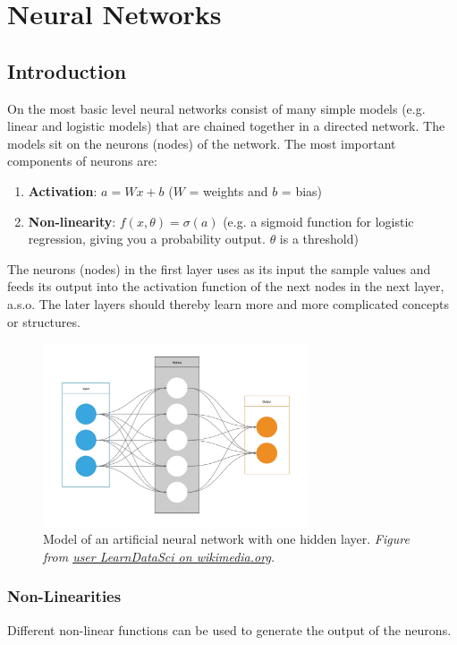 \documentclass[../main.tex]{subfiles}
\begin{document}
\section{Neural Networks} \label{Neural Networks}

\subsection{Introduction}
On the most basic level neural networks consist of many simple models (e.g. linear and logistic models) that are chained together in a directed network. The models sit on the neurons (nodes) of the network. The most important components of neurons are:
\begin{enumerate}
    \item \textbf{Activation}: $a = Wx+b$ ($W$ = weights and $b$ = bias)
    \item \textbf{Non-linearity}: $f(x, \theta)=\sigma(a)$ (e.g. a sigmoid function for logistic regression, giving you a probability output. $\theta$ is a threshold)    
\end{enumerate}
The neurons (nodes) in the first layer uses as its input the sample values and feeds its output into the activation function of the next nodes in the next layer, a.s.o. The later layers should thereby learn more and more complicated concepts or structures. 

\begin{figure}[h]
    \centering
    \includegraphics[width=0.7\textwidth]{../figures/Artificial_Neural_Network.jpg}
    \caption{Model of an artificial neural network with one hidden layer. \textit{Figure from \href{https://commons.wikimedia.org/wiki/File:Artificial_Neural_Network.jpg}{user LearnDataSci on wikimedia.org}.}}
    \label{CDF}
\end{figure}

\subsubsection{Non-Linearities}
Different non-linear functions can be used to generate the output of the neurons. 
\end{document}
